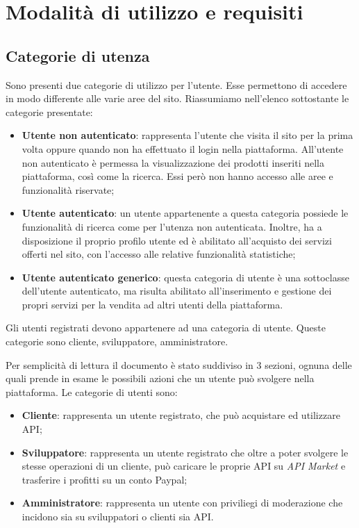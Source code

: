 \newpage
\section{Modalità di utilizzo e requisiti}

\subsection{Categorie di utenza}
Sono presenti due categorie di utilizzo per l'utente. Esse permettono di accedere in modo differente alle varie aree del sito. Riassumiamo nell'elenco sottostante le categorie presentate:

\begin{itemize}
	\item \textbf{Utente non autenticato}: rappresenta l'utente che visita il sito per la prima volta oppure quando non ha effettuato il login nella piattaforma. All'utente non autenticato è permessa la visualizzazione dei prodotti inseriti nella piattaforma, così come la ricerca. Essi però non hanno accesso alle aree e funzionalità riservate;
	\item \textbf{Utente autenticato}: un utente appartenente a questa categoria possiede le funzionalità di ricerca come per l'utenza non autenticata. Inoltre, ha a disposizione il proprio profilo utente ed è abilitato all'acquisto dei servizi offerti nel sito, con l'accesso alle relative funzionalità statistiche;
	\item \textbf{Utente autenticato generico}: questa categoria di utente è una sottoclasse dell'utente autenticato, ma risulta abilitato all'inserimento e gestione dei propri servizi per la vendita ad altri utenti della piattaforma. 
\end{itemize}

Gli utenti registrati devono appartenere ad una categoria di utente. Queste categorie sono cliente, sviluppatore, amministratore.

Per semplicità di lettura il documento è stato suddiviso in 3 sezioni, ognuna delle quali prende in esame le possibili azioni che un utente può svolgere nella piattaforma. Le categorie di utenti sono:
\begin{itemize}
	\item \textbf{Cliente}: rappresenta un utente registrato, che può acquistare ed utilizzare API;
	\item \textbf{Sviluppatore}: rappresenta un utente registrato che oltre a poter svolgere le stesse operazioni di un cliente, può caricare le proprie API su \textit{API Market} e trasferire i profitti su un conto Paypal;
	\item \textbf{Amministratore}: rappresenta un utente con priviliegi di moderazione che incidono sia su sviluppatori o clienti sia API.
\end{itemize}

